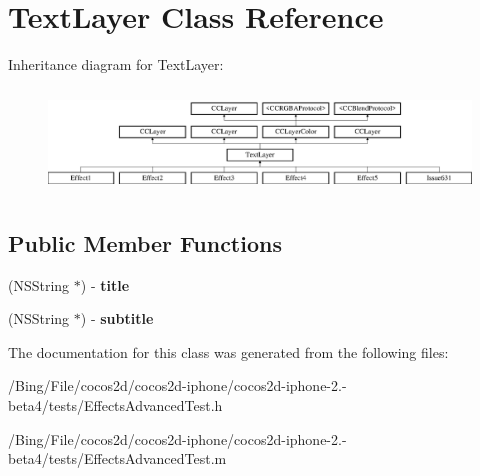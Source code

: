 \hypertarget{interface_text_layer}{\section{Text\-Layer Class Reference}
\label{interface_text_layer}
}
Inheritance diagram for Text\-Layer\-:\begin{figure}[H]
\begin{center}
\leavevmode
\includegraphics[height=2.807017cm]{interface_text_layer}
\end{center}
\end{figure}
\subsection*{Public Member Functions}
\begin{DoxyCompactItemize}
\item 
\hypertarget{interface_text_layer_aafe16c11a23f70140575cd6c9ec7fac9}{(N\-S\-String $\ast$) -\/ {\bfseries title}}\label{interface_text_layer_aafe16c11a23f70140575cd6c9ec7fac9}

\item 
\hypertarget{interface_text_layer_a60483516e0d673023ee6c1c48b228393}{(N\-S\-String $\ast$) -\/ {\bfseries subtitle}}\label{interface_text_layer_a60483516e0d673023ee6c1c48b228393}

\end{DoxyCompactItemize}


The documentation for this class was generated from the following files\-:\begin{DoxyCompactItemize}
\item 
/\-Bing/\-File/cocos2d/cocos2d-\/iphone/cocos2d-\/iphone-\/2.-\/beta4/tests/Effects\-Advanced\-Test.\-h\item 
/\-Bing/\-File/cocos2d/cocos2d-\/iphone/cocos2d-\/iphone-\/2.-\/beta4/tests/Effects\-Advanced\-Test.\-m\end{DoxyCompactItemize}

